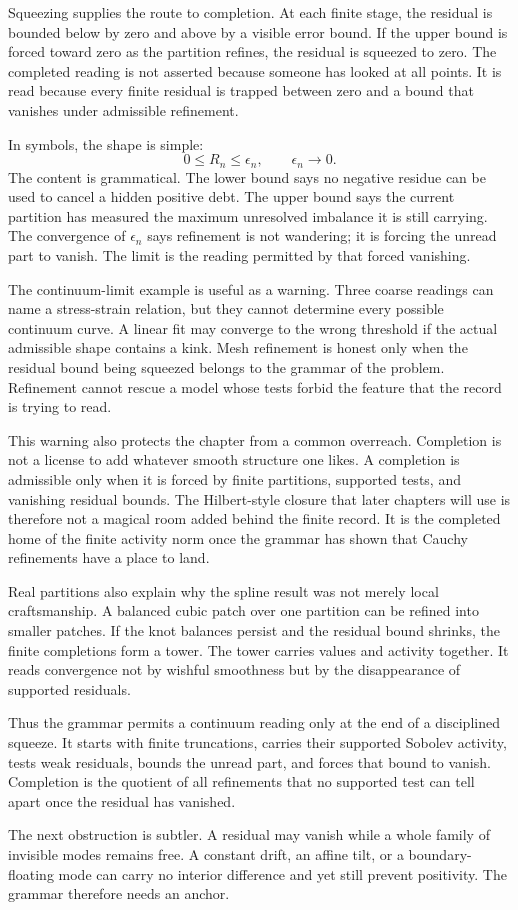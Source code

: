 Squeezing supplies the route to completion. At each finite stage, the
residual is bounded below by zero and above by a visible error bound. If the
upper bound is forced toward zero as the partition refines, the residual is
squeezed to zero. The completed reading is not asserted because someone has
looked at all points. It is read because every finite residual is trapped
between zero and a bound that vanishes under admissible refinement.

In symbols, the shape is simple:
\[
  0 \leq R_n \leq \epsilon_n,
  \qquad \epsilon_n \to 0 .
\]
The content is grammatical. The lower bound says no negative residue can be
used to cancel a hidden positive debt. The upper bound says the current
partition has measured the maximum unresolved imbalance it is still
carrying. The convergence of \(\epsilon_n\) says refinement is not wandering;
it is forcing the unread part to vanish. The limit is the reading permitted
by that forced vanishing.

The continuum-limit example is useful as a warning. Three coarse readings
can name a stress-strain relation, but they cannot determine every possible
continuum curve. A linear fit may converge to the wrong threshold if the
actual admissible shape contains a kink. Mesh refinement is honest only when
the residual bound being squeezed belongs to the grammar of the problem.
Refinement cannot rescue a model whose tests forbid the feature that the
record is trying to read.

This warning also protects the chapter from a common overreach. Completion
is not a license to add whatever smooth structure one likes. A completion is
admissible only when it is forced by finite partitions, supported tests, and
vanishing residual bounds. The Hilbert-style closure that later chapters
will use is therefore not a magical room added behind the finite record. It
is the completed home of the finite activity norm once the grammar has shown
that Cauchy refinements have a place to land.

Real partitions also explain why the spline result was not merely local
craftsmanship. A balanced cubic patch over one partition can be refined into
smaller patches. If the knot balances persist and the residual bound
shrinks, the finite completions form a tower. The tower carries values and
activity together. It reads convergence not by wishful smoothness but by the
disappearance of supported residuals.

Thus the grammar permits a continuum reading only at the end of a disciplined
squeeze. It starts with finite truncations, carries their supported
Sobolev activity, tests weak residuals, bounds the unread part, and forces
that bound to vanish. Completion is the quotient of all refinements that no
supported test can tell apart once the residual has vanished.

The next obstruction is subtler. A residual may vanish while a whole family
of invisible modes remains free. A constant drift, an affine tilt, or a
boundary-floating mode can carry no interior difference and yet still
prevent positivity. The grammar therefore needs an anchor.
